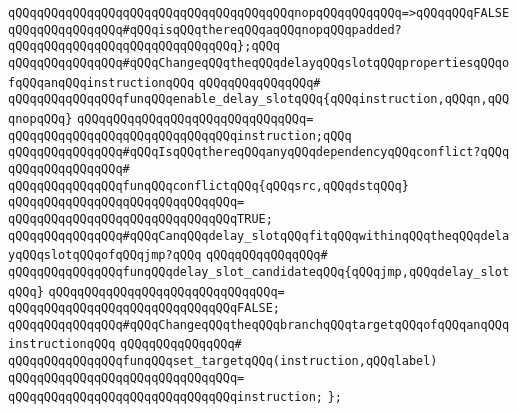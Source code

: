 \verb|qQQqqQQqqQQqqQQqqQQqqQQqqQQqqQQqqQQqqQQqnopqQQqqQQqqQQq=>qQQqqQQqFALSEqQQqqQQqqQQqqQQq#qQQqisqQQqthereqQQqaqQQqnopqQQqpadded?|\newline
\verb|qQQqqQQqqQQqqQQqqQQqqQQqqQQqqQQq};qQQq|\newline
\newline
\newline
\verb|qQQqqQQqqQQqqQQq#qQQqChangeqQQqtheqQQqdelayqQQqslotqQQqpropertiesqQQqofqQQqanqQQqinstructionqQQq|\newline
\verb|qQQqqQQqqQQqqQQq#|\newline
\verb|qQQqqQQqqQQqqQQqfunqQQqenable_delay_slotqQQq{qQQqinstruction,qQQqn,qQQqnopqQQq}|\newline
\verb|qQQqqQQqqQQqqQQqqQQqqQQqqQQqqQQq=|\newline
\verb|qQQqqQQqqQQqqQQqqQQqqQQqqQQqqQQqinstruction;qQQq|\newline
\newline
\newline
\newline
\verb|qQQqqQQqqQQqqQQq#qQQqIsqQQqthereqQQqanyqQQqdependencyqQQqconflict?qQQq|\newline
\verb|qQQqqQQqqQQqqQQq#|\newline
\verb|qQQqqQQqqQQqqQQqfunqQQqconflictqQQq{qQQqsrc,qQQqdstqQQq}|\newline
\verb|qQQqqQQqqQQqqQQqqQQqqQQqqQQqqQQq=|\newline
\verb|qQQqqQQqqQQqqQQqqQQqqQQqqQQqqQQqTRUE;|\newline
\newline
\newline
\verb|qQQqqQQqqQQqqQQq#qQQqCanqQQqdelay_slotqQQqfitqQQqwithinqQQqtheqQQqdelayqQQqslotqQQqofqQQqjmp?qQQq|\newline
\verb|qQQqqQQqqQQqqQQq#|\newline
\verb|qQQqqQQqqQQqqQQqfunqQQqdelay_slot_candidateqQQq{qQQqjmp,qQQqdelay_slotqQQq}|\newline
\verb|qQQqqQQqqQQqqQQqqQQqqQQqqQQqqQQq=|\newline
\verb|qQQqqQQqqQQqqQQqqQQqqQQqqQQqqQQqFALSE;|\newline
\newline
\newline
\verb|qQQqqQQqqQQqqQQq#qQQqChangeqQQqtheqQQqbranchqQQqtargetqQQqofqQQqanqQQqinstructionqQQq|\newline
\verb|qQQqqQQqqQQqqQQq#|\newline
\verb|qQQqqQQqqQQqqQQqfunqQQqset_targetqQQq(instruction,qQQqlabel)|\newline
\verb|qQQqqQQqqQQqqQQqqQQqqQQqqQQqqQQq=|\newline
\verb|qQQqqQQqqQQqqQQqqQQqqQQqqQQqqQQqinstruction;|\newline
\newline
\verb|};|\newline

